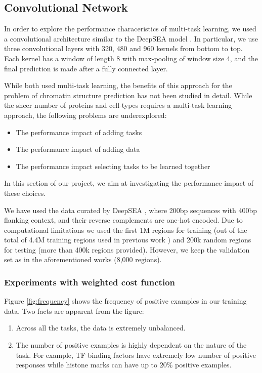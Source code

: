 \documentclass{article}
\begin{document}
\subsection{Convolutional Network}
In order to explore the performance characeristics of multi-task learning, we used a convolutional architecture similar to the DeepSEA model \cite{zhou2015predicting}. In particular, we use three convolutional layers with 320, 480 and 960 kernels from bottom to top.  Each kernel has a window of length 8 with max-pooling of window size 4, and the final prediction is made after a fully connected layer.  

While both \cite{zhou2015predicting,quang2016danq} used multi-task learning, the benefits of this approach for the problem of chromatin structure prediction has not been studied in detail. While the sheer number of proteins and cell-types requires a multi-task learning approach, the following problems are underexplored:
\begin{itemize}
\item The performance impact of adding tasks
\item The performance impact of adding data
\item The performance impact selecting tasks to be learned together
\end{itemize}
In this section of our project, we aim at investigating the performance impact of these choices.

We have used the data curated by DeepSEA \cite{zhou2015predicting}, where 200bp sequences with 400bp flanking context, and their reverse complements are one-hot encoded. Due to computational limitations we used the first 1M regions for training (out of the total of 4.4M training regions used in previous work \cite{zhou2015predicting,quang2016danq}) and 200k random regions for testing (more than 400k regions provided). However, we keep the validation set as in the aforementioned works (8,000 regions). 

\subsubsection{Experiments with weighted cost function}
Figure \ref{fig:frequency} shows the frequency of positive examples in our training data. Two facts are apparent from the figure:
\begin{enumerate}
\item Across all the tasks, the data is extremely unbalanced. 
\item The number of positive examples is highly dependent on the nature of the task. For example, TF binding factors have extremely low number of positive responses while histone marks can have up to $20\%$ positive examples. 
\end{enumerate}
\end{document}
